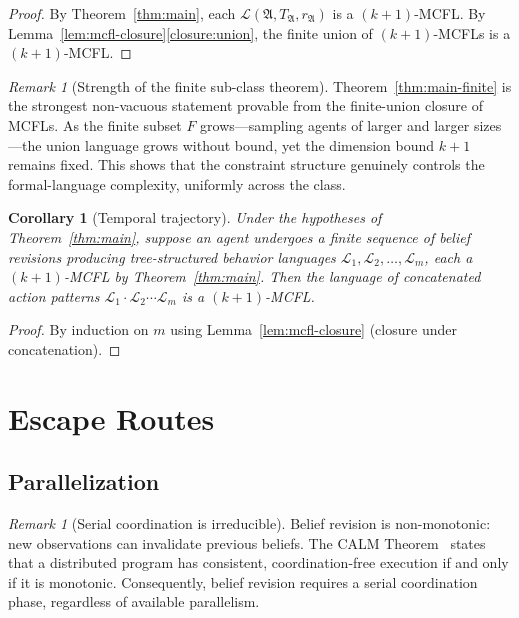 \documentclass[11pt,a4paper]{article}
\theoremstyle{plain}
\newtheorem{corollary}[theorem]{Corollary}
\theoremstyle{definition}
\theoremstyle{remark}
\newtheorem{remark}[theorem]{Remark}
\begin{document}
\begin{proof}
By Theorem~\ref{thm:main}, each $\mathcal{L}(\mathfrak{A}, T_{\mathfrak{A}}, r_{\mathfrak{A}})$ is a $(k{+}1)$-MCFL.
By Lemma~\ref{lem:mcfl-closure}\ref{closure:union}, the finite union of $(k{+}1)$-MCFLs is a $(k{+}1)$-MCFL.
\end{proof}

\begin{remark}[Strength of the finite sub-class theorem]\label{rem:finite-subclass}
Theorem~\ref{thm:main-finite} is the strongest non-vacuous statement provable from the finite-union closure of MCFLs.
As the finite subset $F$ grows---sampling agents of larger and larger sizes---the union language grows without bound, yet the dimension bound $k+1$ remains fixed.
This shows that the constraint structure genuinely controls the formal-language complexity, uniformly across the class.
\end{remark}

\begin{corollary}[Temporal trajectory]\label{cor:temporal}
Under the hypotheses of Theorem~\ref{thm:main}, suppose an agent undergoes a finite sequence of belief revisions producing tree-structured behavior languages $\mathcal{L}_1, \mathcal{L}_2, \ldots, \mathcal{L}_m$, each a $(k{+}1)$-MCFL by Theorem~\ref{thm:main}.
Then the language of concatenated action patterns $\mathcal{L}_1 \cdot \mathcal{L}_2 \cdots \mathcal{L}_m$ is a $(k{+}1)$-MCFL.
\end{corollary}

\begin{proof}
By induction on $m$ using Lemma~\ref{lem:mcfl-closure} (closure under concatenation).
\end{proof}

\section{Escape Routes}\label{sec:escape}

\subsection{Parallelization}\label{sec:parallel}

\begin{remark}[Serial coordination is irreducible]\label{rem:serial}
Belief revision is non-monotonic: new observations can invalidate previous beliefs.
The CALM Theorem~\cite{Hellerstein10} states that a distributed program has consistent, coordination-free execution if and only if it is monotonic.
Consequently, belief revision requires a serial coordination phase, regardless of available parallelism.
\end{remark}
\end{document}

